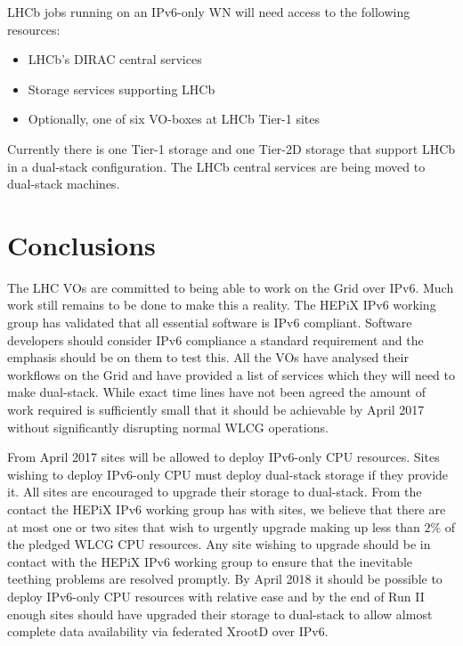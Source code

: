 \documentclass[a4paper]{jpconf}
\begin{document}
LHCb jobs running on an IPv6-only WN will need access to the following
resources:
\begin{itemize}
\item LHCb's DIRAC central services
\item Storage services supporting LHCb
\item Optionally, one of six VO-boxes at LHCb Tier-1 sites
\end{itemize}
Currently there is one Tier-1 storage and one Tier-2D storage that
support LHCb in a dual-stack configuration.  The LHCb central services
are being moved to dual-stack machines.


\section{Conclusions}
The LHC VOs are committed to being able to work on the Grid over IPv6.
Much work still remains to be done to make this a reality.  The HEPiX
IPv6 working group has validated that all essential software is IPv6
compliant.  Software developers should consider IPv6 compliance a
standard requirement and the emphasis should be on them to test this.
All the VOs have analysed their workflows on the Grid and have
provided a list of services which they will need to make dual-stack.
While exact time lines have not been agreed the amount of work
required is sufficiently small that it should be achievable by April
2017 without significantly disrupting normal WLCG operations.

From April 2017 sites will be allowed to deploy IPv6-only CPU
resources. Sites wishing to deploy IPv6-only CPU must deploy
dual-stack storage if they provide it.  All sites are encouraged to
upgrade their storage to dual-stack.  From the contact the HEPiX IPv6
working group has with sites, we believe that there are at most one or
two sites that wish to urgently upgrade making up less than $2\%$ of
the pledged WLCG CPU resources.  Any site wishing to upgrade should be
in contact with the HEPiX IPv6 working group to ensure that the
inevitable teething problems are resolved promptly.  By April 2018 it
should be possible to deploy IPv6-only CPU resources with relative
ease and by the end of Run II enough sites should have upgraded their
storage to dual-stack to allow almost complete data availability via
federated XrootD over IPv6.


\end{document}
